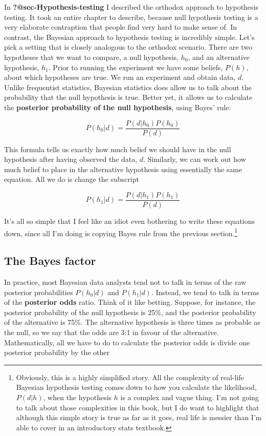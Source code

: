 \documentclass[
  a4paper,
]{book}
\begin{document}
In \textbf{?@sec-Hypothesis-testing} I described the orthodox approach
to hypothesis testing. It took an entire chapter to describe, because
null hypothesis testing is a very elaborate contraption that people find
very hard to make sense of. In contrast, the Bayesian approach to
hypothesis testing is incredibly simple. Let's pick a setting that is
closely analogous to the orthodox scenario. There are two hypotheses
that we want to compare, a null hypothesis, \(h_0\), and an alternative
hypothesis, \(h_1\). Prior to running the experiment we have some
beliefs, \(P(h)\), about which hypotheses are true. We run an experiment
and obtain data, \(d\). Unlike frequentist statistics, Bayesian
statistics does allow us to talk about the probability that the null
hypothesis is true. Better yet, it allows us to calculate the
\textbf{posterior probability of the null hypothesis}, using Bayes'
rule:

\[P(h_0|d)=\frac{P(d|h_0)P(h_0)}{P(d)}\]

This formula tells us exactly how much belief we should have in the null
hypothesis after having observed the data, \(d\). Similarly, we can work
out how much belief to place in the alternative hypothesis using
essentially the same equation. All we do is change the subscript

\[P(h_1|d)=\frac{P(d|h_1)P(h_1)}{P(d)}\]

It's all so simple that I feel like an idiot even bothering to write
these equations down, since all I'm doing is copying Bayes rule from the
previous section.\footnote{Obviously, this is a highly simplified story.
  All the complexity of real-life Bayesian hypothesis testing comes down
  to how you calculate the likelihood, \(P(d|h)\), when the hypothesis
  \(h\) is a complex and vague thing. I'm not going to talk about those
  complexities in this book, but I do want to highlight that although
  this simple story is true as far as it goes, real life is messier than
  I'm able to cover in an introductory stats textbook.}

\hypertarget{the-bayes-factor}{%
\subsection{The Bayes factor}\label{the-bayes-factor}}

In practice, most Bayesian data analysts tend not to talk in terms of
the raw posterior probabilities \(P(h_0|d)\) and \(P(h_1|d)\). Instead,
we tend to talk in terms of the \textbf{posterior odds} ratio. Think of
it like betting. Suppose, for instance, the posterior probability of the
null hypothesis is 25\%, and the posterior probability of the
alternative is 75\%. The alternative hypothesis is three times as
probable as the null, so we say that the odds are 3:1 in favour of the
alternative. Mathematically, all we have to do to calculate the
posterior odds is divide one posterior probability by the other
\end{document}
